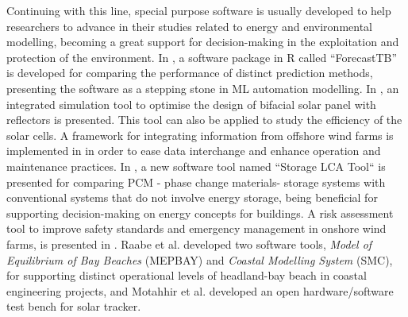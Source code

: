 \documentclass[energies,article,submit,moreauthors,pdftex]{Definitions/mdpi}
\begin{document}
		Continuing with this line, special purpose software is usually developed to help researchers to advance in their studies related to energy and environmental modelling, becoming a great support for decision-making in the exploitation and protection of the environment. In \cite{Neeraj2020}, a software package in R called ``ForecastTB'' is developed for comparing the performance of distinct prediction methods, presenting the software as a stepping stone in ML automation modelling.
		In \cite{LO2015293}, an integrated simulation tool to optimise the design of bifacial solar panel with reflectors is presented. This tool can also be applied to study the efficiency of the solar cells. A framework for integrating information from offshore wind farms is implemented in \cite{NGUYEN2013150} in order to ease data interchange and enhance operation and maintenance practices. 
		In \cite{Roberta2020}, a new software tool named ``Storage LCA Tool`` is presented for comparing PCM - phase change materials- storage systems with conventional systems that do not involve energy storage, being beneficial for supporting decision-making on energy concepts for buildings.
		A risk assessment tool to improve safety standards and emergency management in onshore wind farms, is presented in \cite{ASTIASOGARCIA201648}. Raabe et al. \cite{RAABE2010213} developed two software tools, \textit{Model of Equilibrium of Bay Beaches} (MEPBAY) and \textit{Coastal Modelling System} (SMC), for supporting distinct operational levels of headland-bay beach in coastal engineering projects, and Motahhir et al. \cite{MOTAHHIR20199} developed an open hardware/software test bench for solar tracker.
		
\end{document}
